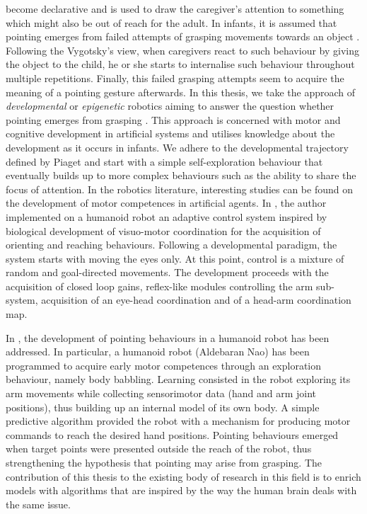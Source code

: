 become declarative and is used to draw the caregiver's attention to 
something which might also be out of reach for the adult.
In infants, it is assumed that pointing emerges from failed attempts of 
grasping movements towards an object \citep{Hafner2011}. Following the 
Vygotsky's view, when caregivers react to such behaviour by giving the object 
to the child, he or she starts to internalise such behaviour throughout 
multiple repetitions. Finally, this failed grasping attempts seem to acquire 
the meaning of a pointing gesture afterwards.
\newline
\phantom{x}\hspace{3ex} In this thesis, we take the approach of \emph{developmental} or 
\emph{epigenetic} robotics aiming to answer the question whether pointing 
emerges from grasping \citep{Kaplan2006}. This approach is concerned with motor 
and cognitive development in artificial systems and utilises knowledge about 
the development as it occurs in infants. We adhere to the developmental 
trajectory defined by Piaget and start with a simple self-exploration behaviour 
that eventually builds up to more complex behaviours such as the ability to 
share the focus of attention.  In the robotics literature, interesting studies 
can be found on the development of motor competences in artificial agents.
In \citep{Metta2000}, the author implemented on a humanoid robot an adaptive 
control system inspired by biological development of visuo-motor coordination 
for the acquisition of orienting and reaching behaviours. Following a 
developmental paradigm, the system starts with moving the eyes only. At this 
point, control is a mixture of random and goal-directed movements. The 
development proceeds with the acquisition of closed loop gains, reflex-like 
modules controlling the arm sub-system, acquisition of an eye-head coordination 
and of a head-arm coordination map. 
 
In \citep{Hafner2011}, the development of pointing behaviours in a humanoid 
robot has been addressed. In particular, a humanoid robot (Aldebaran Nao) has 
been programmed to acquire early motor competences through an exploration 
behaviour, namely body babbling. 
Learning consisted in the robot exploring its arm movements while collecting 
sensorimotor data (hand and arm joint positions), thus building up an internal 
model of its own body. A simple predictive algorithm provided the robot with a 
mechanism for producing motor commands to reach the desired hand positions. 
Pointing behaviours emerged when target points were presented outside the reach 
of the robot, thus strengthening the hypothesis that pointing may arise from 
grasping. The contribution of this thesis to the existing body of research in 
this field is to enrich models with algorithms that are inspired by the way 
the human brain deals with the same issue.

